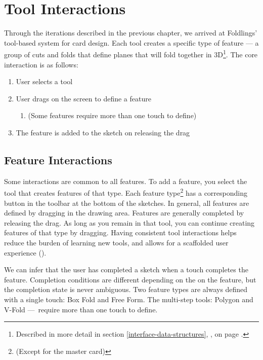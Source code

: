 \section{Tool Interactions}\label{tool-interactions}

Through the iterations described in the previous chapter, we arrived at
Foldlings' tool-based system for card design. Each tool creates a
specific type of feature --- a group of cuts and folds that define
planes that will fold together in 3D\footnote{Described in more detail
  in section \ref{interface-data-structures},
  , on page
  \pageref{interface-data-structures}.}. The core interaction is as
follows:

\begin{enumerate}
\def\labelenumi{\arabic{enumi}.}
\itemsep1pt\parskip0pt
\item
  User selects a tool
\item
  User drags on the screen to define a feature

  \begin{enumerate}
  \def\labelenumii{\alph{enumii}.}
  \itemsep1pt\parskip0pt
  \item
    (Some features require more than one touch to define)
  \end{enumerate}
\item
  The feature is added to the sketch on releasing the drag
\end{enumerate}

\subsection{Feature Interactions}\label{feature-interactions}

Some interactions are common to all features. To add a feature, you
select the tool that creates features of that type. Each feature
type\footnote{(Except for the master card)} has a corresponding button
in the toolbar at the bottom of the sketches. In general, all features
are defined by dragging in the drawing area. Features are generally
completed by releasing the drag. As long as you remain in that tool, you
can continue creating features of that type by dragging. Having
consistent tool interactions helps reduce the burden of learning new
tools, and allows for a scaffolded user experience
(\citet{wood2001scaffolding}).

We can infer that the user has completed a sketch when a touch completes
the feature. Completion conditions are different depending on the on the
feature, but the completion state is never ambiguous. Two feature types
are always defined with a single touch: Box Fold and Free Form. The
multi-step tools: Polygon and V-Fold ---~require more than one touch to
define.

